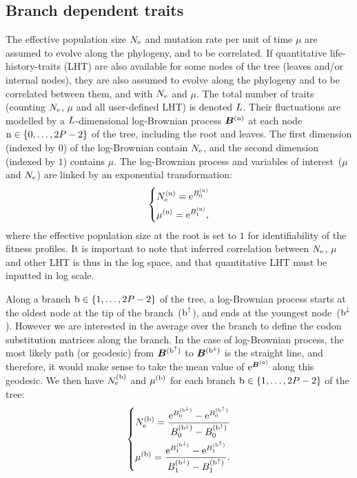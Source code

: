 \subsection{Branch dependent traits}
The effective population size $N_{\mathrm{e}}$ and mutation rate per unit of time $\mu$ are assumed to evolve along the phylogeny, and to be correlated.
If quantitative life-history-traits (\acrshort{LHT}) are also available for some nodes of the tree (leaves and/or internal nodes), they are also assumed to evolve along the phylogeny and to be correlated between them, and with $N_{\mathrm{e}}$ and $\mu$.
The total number of traits (counting $N_{\mathrm{e}}$, $\mu$ and all user-defined LHT) is denoted $L$.
Their fluctuations are modelled by a $L$-dimensional log-Brownian process $\bm{B}^{(\text{n})}$ at each node $\text{n} \in \{0, \hdots, 2 P - 2\}$ of the tree, including the root and leaves.
The first dimension (indexed by $0$) of the log-Brownian contain $N_{\mathrm{e}}$, and the second dimension (indexed by $1$) contains $\mu$.
The log-Brownian process and variables of interest~($\mu$ and $N_{\mathrm{e}}$) are linked by an exponential transformation:
\begin{equation}
    \begin{dcases}
        N_{\mathrm{e}}^{(\text{n})} = \mathrm{e}^{ B_{0}^{(\text{n})} } \\
        \mu^{(\text{n})} = \mathrm{e}^{ B_{1}^{(\text{n})} },
    \end{dcases}
\end{equation}
where the effective population size at the root is set to $1$ for identifiability of the fitness profiles.
It is important to note that inferred correlation between $N_{\mathrm{e}}$, $\mu$ and other \acrshort{LHT} is thus in the log space, and that quantitative \acrshort{LHT} must be inputted in log scale.

Along a branch $\text{b} \in \{1, \hdots, 2 P - 2\}$ of the tree, a log-Brownian process starts at the oldest node at the tip of the branch~($\text{b}^{\uparrow}$), and ends at the youngest node~($\text{b}^{\downarrow}$).
However we are interested in the average over the branch to define the codon substitution matrices along the branch.
In the case of log-Brownian process, the most likely path (or geodesic) from $\bm{B}^{(\text{b}^{\uparrow})}$ to $\bm{B}^{(\text{b}^{\downarrow})}$ is the straight line, and therefore, it would make sense to take the mean value of $\mathrm{e}^{\bm{B}^{(\text{n})}}$ along this geodesic.
We then have $N_{\mathrm{e}}^{(\text{b})}$ and $\mu^{(\text{b})}$ for each branch $\text{b} \in \{1, \hdots, 2 P - 2\}$ of the tree:
\begin{equation}
    \label{eq:branchNemu}
    \begin{dcases}
        \Ne\branchexp = \dfrac{\e^{\brownian_{0}^{(\nodeDown)}} - \e^{\brownian_{0}^{(\nodeUp)}}}{\brownian_{0}^{(\nodeDown)} - \brownian_{0}^{(\nodeUp)}} \\
        \mu\branchexp = \dfrac{\e^{\brownian_{1}^{(\nodeDown)}} - \e^{\brownian_{1}^{(\nodeUp)}}}{\brownian_{1}^{(\nodeDown)} - \brownian_{1}^{(\nodeUp)}}.
    \end{dcases}
\end{equation}

